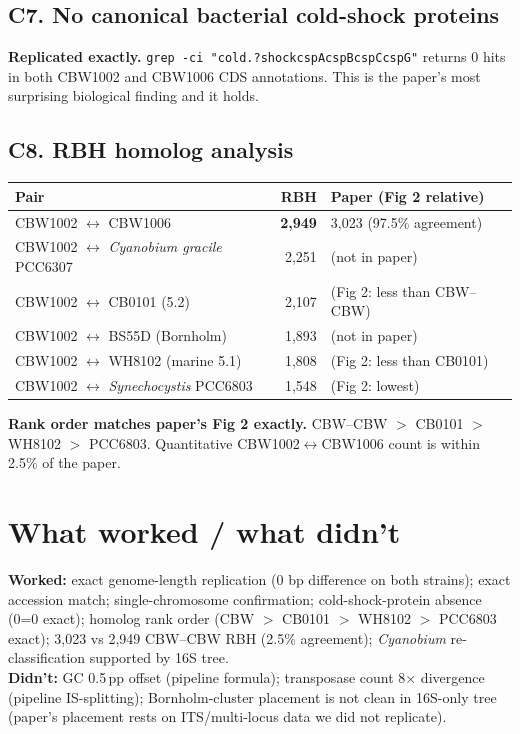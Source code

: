 \documentclass[11pt]{article}
\begin{document}
\subsection{C7. No canonical bacterial cold-shock proteins}
\textbf{Replicated exactly.} \texttt{grep -ci "cold.?shock\textbar{}cspA\textbar{}cspB\textbar{}cspC\textbar{}cspG"} returns 0 hits in both CBW1002 and CBW1006 CDS annotations. This is the paper's most surprising biological finding and it holds.

\subsection{C8. RBH homolog analysis}
\begin{center}
\begin{tabular}{lrl}
\toprule
Pair & RBH & Paper (Fig 2 relative) \\ \midrule
CBW1002 $\leftrightarrow$ CBW1006 & \textbf{2{,}949} & 3{,}023 (97.5\% agreement) \\
CBW1002 $\leftrightarrow$ \emph{Cyanobium gracile} PCC6307 & 2{,}251 & (not in paper) \\
CBW1002 $\leftrightarrow$ CB0101 (5.2) & 2{,}107 & (Fig 2: less than CBW--CBW) \\
CBW1002 $\leftrightarrow$ BS55D (Bornholm) & 1{,}893 & (not in paper) \\
CBW1002 $\leftrightarrow$ WH8102 (marine 5.1) & 1{,}808 & (Fig 2: less than CB0101) \\
CBW1002 $\leftrightarrow$ \emph{Synechocystis} PCC6803 & 1{,}548 & (Fig 2: lowest) \\ \bottomrule
\end{tabular}
\end{center}
\textbf{Rank order matches paper's Fig 2 exactly.} CBW--CBW $>$ CB0101 $>$ WH8102 $>$ PCC6803. Quantitative CBW1002$\leftrightarrow$CBW1006 count is within 2.5\% of the paper.

\section{What worked / what didn't}
\textbf{Worked:} exact genome-length replication (0 bp difference on both strains); exact accession match; single-chromosome confirmation; cold-shock-protein absence (0=0 exact); homolog rank order (CBW $>$ CB0101 $>$ WH8102 $>$ PCC6803 exact); 3{,}023 vs 2{,}949 CBW--CBW RBH (2.5\% agreement); \emph{Cyanobium} re-classification supported by 16S tree.\\
\textbf{Didn't:} GC 0.5\,pp offset (pipeline formula); transposase count 8$\times$ divergence (pipeline IS-splitting); Bornholm-cluster placement is not clean in 16S-only tree (paper's placement rests on ITS/multi-locus data we did not replicate).
\end{document}
